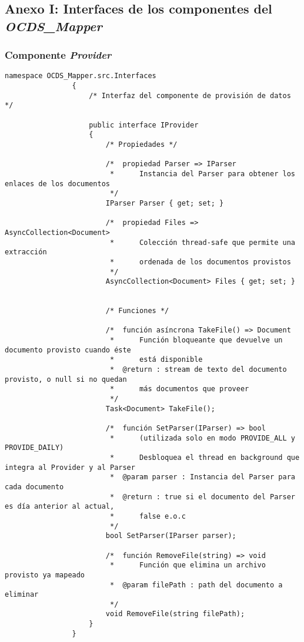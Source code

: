 
    \subsection{Anexo I: Interfaces de los componentes del \textit{OCDS\_Mapper}}
        \subsubsection{Componente \textit{Provider}}
            \begin{lstlisting}[language=lCSharp]
                namespace OCDS_Mapper.src.Interfaces
                {
                    /* Interfaz del componente de provisión de datos */
                
                    public interface IProvider
                    {
                        /* Propiedades */
                
                        /*  propiedad Parser => IParser
                         *      Instancia del Parser para obtener los enlaces de los documentos
                         */
                        IParser Parser { get; set; }
                
                        /*  propiedad Files => AsyncCollection<Document>
                         *      Colección thread-safe que permite una extracción
                         *      ordenada de los documentos provistos
                         */
                        AsyncCollection<Document> Files { get; set; }
                
                
                        /* Funciones */
                
                        /*  función asíncrona TakeFile() => Document
                         *      Función bloqueante que devuelve un documento provisto cuando éste
                         *      está disponible
                         *  @return : stream de texto del documento provisto, o null si no quedan
                         *      más documentos que proveer
                         */
                        Task<Document> TakeFile();
                
                        /*  función SetParser(IParser) => bool
                         *      (utilizada solo en modo PROVIDE_ALL y PROVIDE_DAILY)
                         *      Desbloquea el thread en background que integra al Provider y al Parser
                         *  @param parser : Instancia del Parser para cada documento
                         *  @return : true si el documento del Parser es día anterior al actual,
                         *      false e.o.c
                         */
                        bool SetParser(IParser parser);
                
                        /*  función RemoveFile(string) => void
                         *      Función que elimina un archivo provisto ya mapeado
                         *  @param filePath : path del documento a eliminar
                         */
                        void RemoveFile(string filePath);
                    }
                }
            \end{lstlisting}
\newpage
